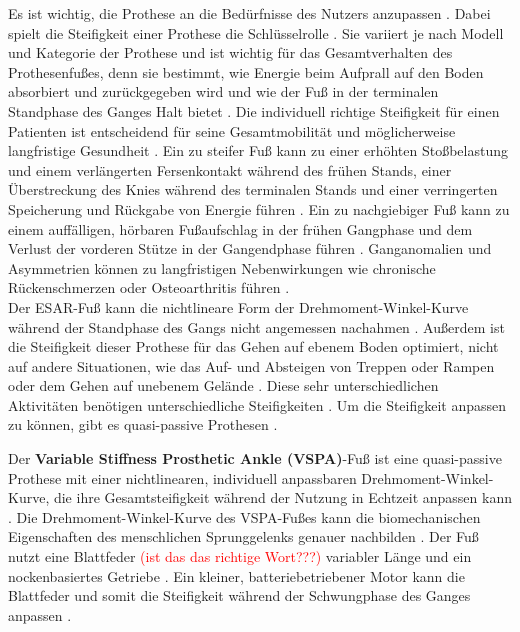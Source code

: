 Es ist wichtig, die Prothese an die Bedürfnisse des Nutzers anzupassen \cite{Stevens.2018}. Dabei spielt die Steifigkeit einer Prothese die Schlüsselrolle \cite{Shepherd.2020}. 
Sie variiert je nach Modell und Kategorie der Prothese und ist wichtig für das Gesamtverhalten des Prothesenfußes, denn sie bestimmt, wie Energie beim Aufprall auf den Boden absorbiert und zurückgegeben wird und wie der Fuß in der terminalen Standphase des Ganges Halt bietet \cite{Shepherd.2020}. Die individuell richtige Steifigkeit für einen Patienten ist entscheidend für seine Gesamtmobilität und möglicherweise langfristige Gesundheit \cite{Shepherd.2020}. 
Ein zu steifer Fuß kann zu einer erhöhten Stoßbelastung und einem verlängerten Fersenkontakt während des frühen Stands, einer Überstreckung des Knies während des terminalen Stands und einer verringerten Speicherung und Rückgabe von Energie führen \cite{Shepherd.2020}. Ein zu nachgiebiger Fuß kann zu einem auffälligen, hörbaren Fußaufschlag in der frühen Gangphase und dem Verlust der vorderen Stütze in der Gangendphase führen \cite{Shepherd.2020}. 
Ganganomalien und Asymmetrien können zu langfristigen Nebenwirkungen wie chronische Rückenschmerzen oder Osteoarthritis führen \cite{Shepherd.2020}. \\

Der ESAR-Fuß kann die nichtlineare Form der Drehmoment-Winkel-Kurve während der Standphase des Gangs nicht angemessen nachahmen \cite{Shepherd.2017}. Außerdem ist die Steifigkeit dieser Prothese für das Gehen auf ebenem Boden optimiert, nicht auf andere Situationen, wie das Auf- und Absteigen von Treppen oder Rampen oder dem Gehen auf unebenem Gelände \cite{Shepherd.2017}. Diese sehr unterschiedlichen Aktivitäten benötigen unterschiedliche Steifigkeiten \cite{Shepherd.2017}. Um die Steifigkeit anpassen zu können, gibt es quasi-passive Prothesen \cite{Shepherd.2017}. 

Der \textbf{Variable Stiffness Prosthetic Ankle (VSPA)}-Fuß ist eine quasi-passive Prothese mit einer nichtlinearen, individuell anpassbaren Drehmoment-Winkel-Kurve, die ihre Gesamtsteifigkeit während der Nutzung in Echtzeit anpassen kann \cite{Shepherd.2017}. Die Drehmoment-Winkel-Kurve des VSPA-Fußes kann die biomechanischen Eigenschaften des menschlichen Sprunggelenks genauer nachbilden \cite{Shepherd.2017}. Der Fuß nutzt eine Blattfeder \textcolor{red}{(ist das das richtige Wort???)} variabler Länge und ein nockenbasiertes Getriebe \cite{Shetty.2022}. Ein kleiner, batteriebetriebener Motor kann die Blattfeder und somit die Steifigkeit während der Schwungphase des Ganges anpassen \cite{Shetty.2022}. %

